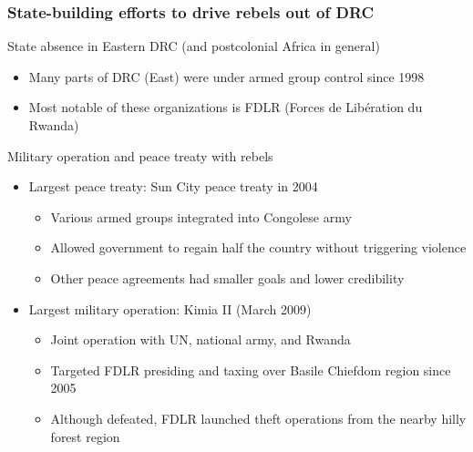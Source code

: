 \documentclass[aspectratio=169]{beamer}
\begin{document}
\begin{frame}
\frametitle{State-building efforts to drive rebels out of DRC} 
State absence in Eastern DRC (and postcolonial Africa in general)
\begin{itemize}\setlength\itemsep{3pt}
\item Many parts of DRC (East) were under armed group control since 1998
\item Most notable of these organizations is FDLR (Forces de Libération du Rwanda)
\end{itemize}\medskip
Military operation and peace treaty with rebels
\begin{itemize}\setlength\itemsep{3pt}
\item Largest peace treaty: Sun City peace treaty in 2004
\begin{itemize}\setlength\itemsep{3pt}
\item Various armed groups integrated into Congolese army
\item Allowed government to regain half the country without triggering violence
\item Other peace agreements had smaller goals and lower credibility
\end{itemize}
\item Largest military operation: Kimia II (March 2009)
\begin{itemize}\setlength\itemsep{3pt}
\item Joint operation with UN, national army, and Rwanda
\item Targeted FDLR presiding and taxing over Basile Chiefdom region since 2005
\item Although defeated, FDLR launched theft operations from the nearby hilly forest region
\end{itemize}
\end{itemize}
\end{frame}
\end{document}
